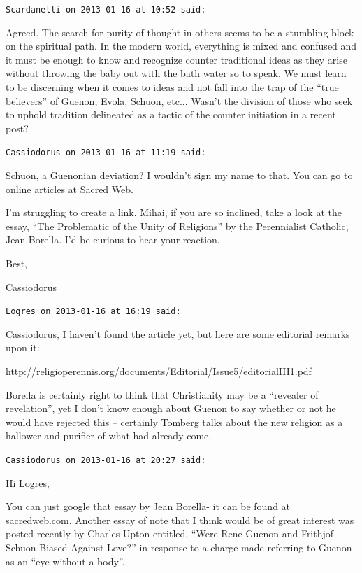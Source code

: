 \begin{footnotesize}
\begin{sffamily}
\hfill

\texttt{Scardanelli on 2013-01-16 at 10:52 said:}

Agreed. The search for purity of thought in others seems to be a stumbling block on the spiritual path. In the modern world, everything is mixed and confused and it must be enough to know and recognize counter traditional ideas as they arise without throwing the baby out with the bath water so to speak. We must learn to be discerning when it comes to ideas and not fall into the trap of the ``true believers'' of Guenon, Evola, Schuon, etc... Wasn't the division of those who seek to uphold tradition delineated as a tactic of the counter initiation in a recent post?

\hfill

\texttt{Cassiodorus on 2013-01-16 at 11:19 said:}

Schuon, a Guenonian deviation? I wouldn't sign my name to that. You can go to online articles at Sacred Web.

I'm struggling to create a link. Mihai, if you are so inclined, take a look at the essay, ``The Problematic of the Unity of Religions'' by the Perennialist Catholic, Jean Borella. I'd be curious to hear your reaction.

Best,

Cassiodorus

\hfill

\texttt{Logres on 2013-01-16 at 16:19 said:}

Cassiodorus, I haven't found the article yet, but here are some editorial remarks upon it:

\url{http://religioperennis.org/documents/Editorial/Issue5/editorialIII1.pdf}

Borella is certainly right to think that Christianity may be a ``revealer of revelation'', yet I don't know enough about Guenon to say whether or not he would have rejected this -- certainly Tomberg talks about the new religion as a hallower and purifier of what had already come.

\hfill

\texttt{Cassiodorus on 2013-01-16 at 20:27 said:}

Hi Logres,

You can just google that essay by Jean Borella- it can be found at sacredweb.com. Another essay of note that I think would be of great interest was posted recently by Charles Upton entitled, ``Were Rene Guenon and Frithjof Schuon Biased Against Love?'' in response to a charge made referring to Guenon as an ``eye without a body''.


\end{sffamily}
\end{footnotesize}

